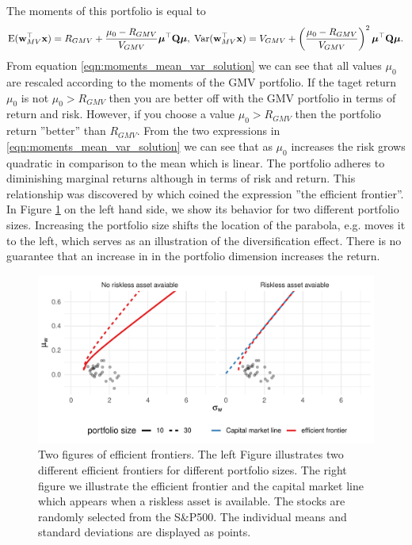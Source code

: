 \documentclass[]{book}\usepackage{knitr}
\begin{document}
The moments of this portfolio is equal to
\begin{equation}\label{eqn:moments_mean_var_solution}
\operatorname{E}(\mathbf{w}_{MV}^\top\mathbf{x}) = R_{GMV} + \frac{\mu_0 - R_{GMV}}{V_{GMV}} \mbox{\boldmath$\mu$}^\top \mathbf{Q} \mbox{\boldmath$\mu$}, \;
\operatorname{Var}(\mathbf{w}_{MV}^\top\mathbf{x}) =V_{GMV} + \left(\frac{\mu_0 - R_{GMV}}{V_{GMV}}\right)^2 \mbox{\boldmath$\mu$}^\top \mathbf{Q} \mbox{\boldmath$\mu$}.
\end{equation}
From equation \eqref{eqn:moments_mean_var_solution} we can see that all values $\mu_0$ are rescaled according to the moments of the GMV portfolio. 
If the taget return $\mu_0$ is not $\mu_0>R_{GMV}$ then you are better off with the GMV portfolio in terms of return and risk.
However, if you choose a value $\mu_0>R_{GMV}$ then the portfolio return ''better'' than $R_{GMV}$. From the two expressions in \eqref{eqn:moments_mean_var_solution} we can see that as $\mu_0$ increases the risk grows quadratic in comparison to the mean which is linear. The portfolio adheres to diminishing marginal returns although in terms of risk and return. This relationship was discovered by \textcite{merton1972} which coined the expression ''the efficient frontier''. In Figure \ref{fig:mertons_efficient_frontier} on the left hand side, we show its behavior for two different portfolio sizes. Increasing the portfolio size shifts the location of the parabola, e.g. moves it to the left, which serves as an illustration of the diversification effect. There is no guarantee that an increase in in the portfolio dimension increases the return.
\begin{knitrout}
\color{fgcolor}\begin{figure}

{\centering \includegraphics[width=\maxwidth]{figure/mertons_efficient_frontier-1} 

}

\caption[Two figures of efficient frontiers]{Two figures of efficient frontiers. The left Figure illustrates two different efficient frontiers for different portfolio sizes. The right figure we illustrate the efficient frontier and the capital market line which appears when a riskless asset is available. The stocks are randomly selected from the S\&P500. The individual means and standard deviations are displayed as points.}\label{fig:mertons_efficient_frontier}
\end{figure}

\end{knitrout}
\end{document}
